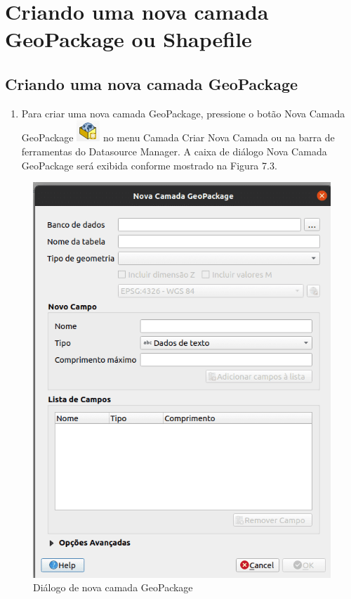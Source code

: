 \documentclass[
]{krantz}
\providecommand{\tightlist}{%
  \setlength{\itemsep}{0pt}\setlength{\parskip}{0pt}}
\begin{document}
\hypertarget{criando-uma-nova-camada-geopackage-ou-shapefile}{%
\section{Criando uma nova camada GeoPackage ou Shapefile}\label{criando-uma-nova-camada-geopackage-ou-shapefile}}

\hypertarget{criando-uma-nova-camada-geopackage}{%
\subsection{Criando uma nova camada GeoPackage}\label{criando-uma-nova-camada-geopackage}}

\begin{enumerate}
\def\labelenumi{\arabic{enumi}.}
\tightlist
\item
  Para criar uma nova camada GeoPackage, pressione o botão Nova Camada GeoPackage \includegraphics{media/modulo7/geopackage-button.png}
  no menu Camada Criar Nova Camada ou na barra de ferramentas do Datasource Manager. A caixa de diálogo Nova Camada GeoPackage será exibida conforme mostrado na Figura 7.3.
\end{enumerate}

\begin{figure}
\centering
\includegraphics{media/modulo7/new-geopackage-dialog.png}
\caption{Diálogo de nova camada GeoPackage}
\end{figure}
\end{document}

